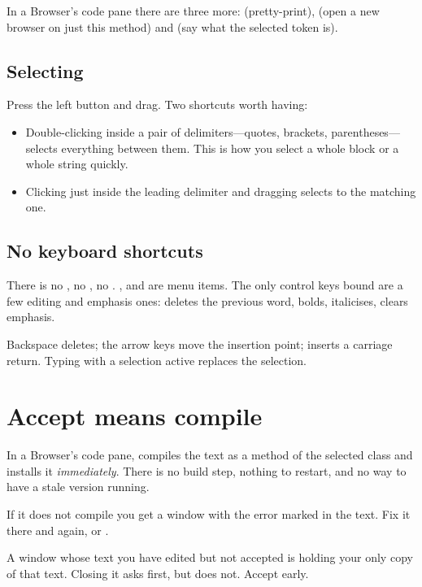 In a Browser's code pane there are three more:  (pretty-print),
 (open a new browser on just this method) and  (say what
the selected token is).

\subsection{Selecting}

Press the left button and drag. Two shortcuts worth having:

\begin{itemize}
\item Double-clicking inside a pair of delimiters---quotes, brackets,
  parentheses---selects everything between them. This is how you select a
  whole block or a whole string quickly.
\item Clicking just inside the leading delimiter and dragging selects to the
  matching one.
\end{itemize}

\subsection{No keyboard shortcuts}

There is no , no , no . ,
 and  are menu items. The only control keys bound are a
few editing and emphasis ones:  deletes the previous word,
 bolds,  italicises,  clears emphasis.

\begin{stnote}
Backspace deletes; the arrow keys move the insertion point; 
inserts a carriage return. Typing with a selection active replaces the
selection.
\end{stnote}

\section{Accept means compile}

In a Browser's code pane,  compiles the text as a method of the
selected class and installs it \emph{immediately}. There is no build step,
nothing to restart, and no way to have a stale version running.

If it does not compile you get a  window with the error marked
in the text. Fix it there and  again, or .

\begin{stwarn}
A window whose text you have edited but not accepted is holding your only copy
of that text. Closing it asks first, but  does not. Accept early.
\end{stwarn}

